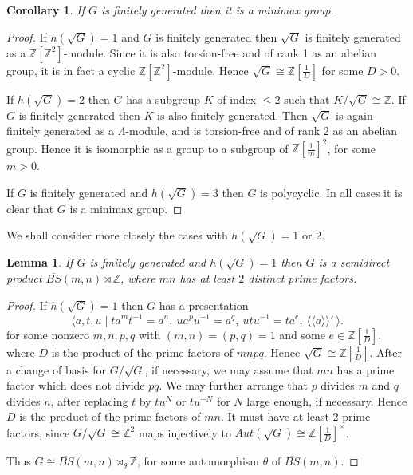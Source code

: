 \documentclass[12pt]{amsart}
\renewcommand{\leq}{\leqslant}
\newtheorem{lemma}[theorem]{Lemma}
\newtheorem{cor}[theorem]{Corollary}
\begin{document}
\begin{cor}
\label{minimax}
If $G$ is finitely generated then it is a minimax group.
\end{cor}

\begin{proof}
If $h(\sqrt{G})=1$ and $G$ is finitely generated then $\sqrt{G}$ 
is finitely generated as a $\mathbb{Z}[\mathbb{Z}^2]$-module.
Since it is also torsion-free and of rank 1 as an abelian group, 
it is in fact a cyclic $\mathbb{Z}[\mathbb{Z}^2]$-module.
Hence $\sqrt{G}\cong\mathbb{Z}[\frac1D]$ for some $D>0$.

If $h(\sqrt{G})=2$ then $G$ has a subgroup $K$
of index $\leq2$ such that $K/\sqrt{G}\cong\mathbb{Z}$.
If $G$ is finitely generated then $K$ is also finitely generated.
Then $\sqrt{G}$ is again finitely generated as a $\Lambda$-module,
and is torsion-free and of rank 2 as an abelian group.
Hence it is isomorphic as a group to a subgroup of $\mathbb{Z}[\frac1m]^2$, 
for some $m>0$.

If $G$ is finitely generated and $h(\sqrt{G})=3$ then $G$ is polycyclic.
In all cases it is clear that $G$ is a minimax group.
\end{proof}

We shall consider more closely the cases with $h(\sqrt{G})=1$ or 2.

\begin{lemma}
If $G$ is finitely generated and $h(\sqrt{G})=1$ then
$G$ is a semidirect product $\overline{BS}(m,n)\rtimes\mathbb{Z}$,
where $mn$ has at least $2$ distinct prime factors.
\end{lemma}

\begin{proof}
If $h(\sqrt{G})=1$ then $G$ has a presentation  
\[
\langle{a,t,u}\mid {ta^mt^{-1}=a^n},~ua^pu^{-1}=a^q,~utu^{-1}=ta^e,
~\langle\langle{a}\rangle\rangle'~\rangle.
\]
for some nonzero $m,n,p,q$ with $(m,n)=(p,q)=1$ and some 
$e\in\mathbb{Z}[\frac1D]$,
where $D$ is the product of the prime factors of $mnpq$.
Hence $\sqrt{G}\cong\mathbb{Z}[\frac1D]$.
After a change of basis for $G/\sqrt{G}$, 
if necessary, 
we may assume that $mn$ has a prime factor which does not divide $pq$.
We may further arrange that $p$ divides $m$ and $q$ divides $n$, 
after replacing $t$ by $tu^N$ or $tu^{-N}$ for $N$ large enough, 
if necessary.
Hence $D$ is the product of the prime factors of $mn$.
It must have at least 2 prime factors,
since $G/\sqrt{G}\cong\mathbb{Z}^2$ maps injectively to
$Aut(\sqrt{G})\cong\mathbb{Z}[\frac1D]^\times$.

Thus $G\cong\overline{BS}(m,n)\rtimes_\theta\mathbb{Z}$,
for some automorphism $\theta$ of $\overline{BS}(m,n)$.
\end{proof}
\end{document}
